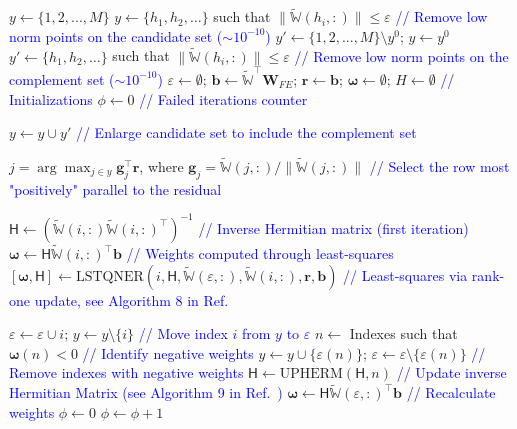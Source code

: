 \documentclass[11pt]{article}
\renewcommand{\vec}[1]{\mathbf{#1}}
\newcommand{\mat}[1]{\mathsf{#1}}
\begin{document}
\begin{algorithm}[H]                  
\begin{algorithmic} [1]                   %
    \STATE $y\leftarrow \{1, 2, ..., M\}$
    \STATE $y\leftarrow \{h_1, h_2, \dots\}$ such that $\| \widetilde{\mathbb{W}}(h_i, :) \| \leq \varepsilon$ \textcolor{blue}{// Remove low norm points on the candidate set ($\sim 10^{-10}$)}
\ELSE
    \STATE $y' \leftarrow \{1, 2, ..., M\} \setminus y^0$; \quad $y\leftarrow y^0$
    \STATE $y' \leftarrow \{h_1, h_2, \dots\}$ such that $\| \widetilde{\mathbb{W}}(h_i, :) \| \leq \varepsilon$ \textcolor{blue}{// Remove low norm points on the complement set ($\sim 10^{-10}$)}
\ENDIF
\STATE $\varepsilon \leftarrow \emptyset$; $\vec{b} \leftarrow \widetilde{\mathbb{W}}^\top \vec{W}_{FE}$; $\vec{r} \leftarrow \vec{b}$; $\boldsymbol\omega \leftarrow \emptyset$; $H \leftarrow \emptyset$ \textcolor{blue}{// Initializations}
\STATE $\phi \leftarrow 0$ \textcolor{blue}{// Failed iterations counter}

    \IF{$\phi > \lambda$}
        \STATE $y\leftarrow y \cup y'$ \textcolor{blue}{// Enlarge candidate set to include the complement set}
    \ENDIF

    \STATE $j = \arg\max_{j \in y} \vec{g}_j^\top \vec{r}$, where $\vec{g}_j = \widetilde{\mathbb{W}}(j, :) / \| \widetilde{\mathbb{W}}(j, :) \|$ \textcolor{blue}{// Select the row most "positively" parallel to the residual}

        \STATE $\mat{H}\leftarrow (\widetilde{\mathbb{W}}(i, :) \widetilde{\mathbb{W}}(i, :)^\top)^{-1}$ \textcolor{blue}{// Inverse Hermitian matrix (first iteration)}
        \STATE $\boldsymbol\omega \leftarrow \mat{H}\widetilde{\mathbb{W}}(i, :)^\top \vec{b}$ \textcolor{blue}{// Weights computed through least-squares}
    \ELSE
        \STATE $[\boldsymbol\omega, \mat{H}] \leftarrow \text{LSTQNER}(i, \mat{H}, \widetilde{\mathbb{W}}(\varepsilon, :), \widetilde{\mathbb{W}}(i, :), \vec{r}, \vec{b})$ \textcolor{blue}{// Least-squares via rank-one update, see Algorithm 8 in Ref.~\cite{bravo2024subspace}}
    \ENDIF

    \STATE $\varepsilon \leftarrow \varepsilon \cup i$; $y\leftarrow y \setminus \{i\}$ \textcolor{blue}{// Move index $i$ from $y$ to $\varepsilon$}
    \STATE $n \leftarrow$ Indexes such that $\boldsymbol\omega(n) < 0$ \textcolor{blue}{// Identify negative weights}
    \STATE $y\leftarrow y \cup \{\varepsilon(n)\}$; $\varepsilon \leftarrow \varepsilon \setminus \{\varepsilon(n)\}$ \textcolor{blue}{// Remove indexes with negative weights}
    \STATE $\mat{H}\leftarrow \text{UPHERM}(\mat{H}, n)$ \textcolor{blue}{// Update inverse Hermitian Matrix (see Algorithm 9 in Ref.~\cite{bravo2024subspace})}
    \STATE $\boldsymbol\omega \leftarrow \mat{H}\widetilde{\mathbb{W}}(\varepsilon, :)^\top \vec{b}$ \textcolor{blue}{// Recalculate weights}
        \STATE $\phi \leftarrow 0$
    \ELSE
        \STATE $\phi \leftarrow \phi + 1$
    \ENDIF


\end{algorithmic}
\end{algorithm}
\end{document}
